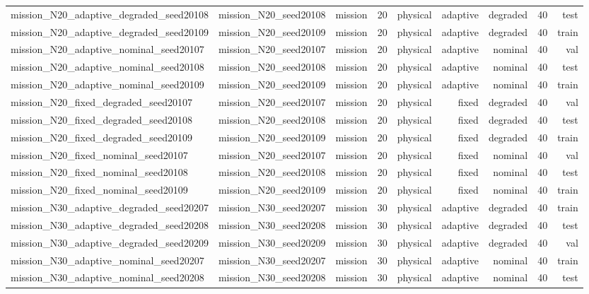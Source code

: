\begin{tabular}{lrrrrrrrr}
mission\_N20\_adaptive\_degraded\_seed20108 & mission\_N20\_seed20108 & mission & 20 & physical & adaptive & degraded & 40 & test \\
mission\_N20\_adaptive\_degraded\_seed20109 & mission\_N20\_seed20109 & mission & 20 & physical & adaptive & degraded & 40 & train \\
mission\_N20\_adaptive\_nominal\_seed20107 & mission\_N20\_seed20107 & mission & 20 & physical & adaptive & nominal & 40 & val \\
mission\_N20\_adaptive\_nominal\_seed20108 & mission\_N20\_seed20108 & mission & 20 & physical & adaptive & nominal & 40 & test \\
mission\_N20\_adaptive\_nominal\_seed20109 & mission\_N20\_seed20109 & mission & 20 & physical & adaptive & nominal & 40 & train \\
mission\_N20\_fixed\_degraded\_seed20107 & mission\_N20\_seed20107 & mission & 20 & physical & fixed & degraded & 40 & val \\
mission\_N20\_fixed\_degraded\_seed20108 & mission\_N20\_seed20108 & mission & 20 & physical & fixed & degraded & 40 & test \\
mission\_N20\_fixed\_degraded\_seed20109 & mission\_N20\_seed20109 & mission & 20 & physical & fixed & degraded & 40 & train \\
mission\_N20\_fixed\_nominal\_seed20107 & mission\_N20\_seed20107 & mission & 20 & physical & fixed & nominal & 40 & val \\
mission\_N20\_fixed\_nominal\_seed20108 & mission\_N20\_seed20108 & mission & 20 & physical & fixed & nominal & 40 & test \\
mission\_N20\_fixed\_nominal\_seed20109 & mission\_N20\_seed20109 & mission & 20 & physical & fixed & nominal & 40 & train \\
mission\_N30\_adaptive\_degraded\_seed20207 & mission\_N30\_seed20207 & mission & 30 & physical & adaptive & degraded & 40 & train \\
mission\_N30\_adaptive\_degraded\_seed20208 & mission\_N30\_seed20208 & mission & 30 & physical & adaptive & degraded & 40 & test \\
mission\_N30\_adaptive\_degraded\_seed20209 & mission\_N30\_seed20209 & mission & 30 & physical & adaptive & degraded & 40 & val \\
mission\_N30\_adaptive\_nominal\_seed20207 & mission\_N30\_seed20207 & mission & 30 & physical & adaptive & nominal & 40 & train \\
mission\_N30\_adaptive\_nominal\_seed20208 & mission\_N30\_seed20208 & mission & 30 & physical & adaptive & nominal & 40 & test \\

\end{tabular}
